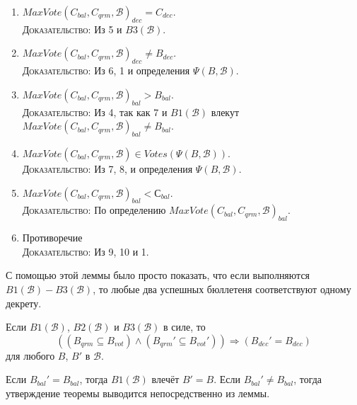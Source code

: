 \documentclass[12pt, a4paper]{article} %
\begin{document}
\begin{lemmaproof}
\begin{enumerate}
    \item $MaxVote(C_{bal}, C_{qrm}, \mathcal{B})_{dec} = C_{dec}$.\\
          \textsc{Доказательство}: Из 5 и $B3(\mathcal{B})$.

    \item $MaxVote(C_{bal}, C_{qrm}, \mathcal{B})_{dec} \neq B_{dec}$.\\
          \textsc{Доказательство}: Из 6, 1 и определения $\Psi(B, \mathcal{B})$.

    \item $MaxVote(C_{bal}, C_{qrm}, \mathcal{B})_{bal} > B_{bal}$.\\
          \textsc{Доказательство}: Из 4, так как 7 и $B1(\mathcal{B})$ влекут \\
          $MaxVote(C_{bal}, C_{qrm}, \mathcal{B})_{bal} \neq B_{bal}$.

    \item $MaxVote(C_{bal}, C_{qrm}, \mathcal{B}) \in Votes(\Psi(B, \mathcal{B}))$.\\
          \textsc{Доказательство}: Из 7, 8, и определения $\Psi(B, \mathcal{B})$.

    \item $MaxVote(C_{bal}, C_{qrm}, \mathcal{B})_{bal} < С_{bal}$.\\
          \textsc{Доказательство}: По определению $MaxVote(C_{bal}, C_{qrm}, \mathcal{B})_{bal}$.
    
    \item Противоречие\\
          \textsc{Доказательство}: Из 9, 10 и 1.
\end{enumerate}
\end{lemmaproof}

С помощью этой леммы было просто показать, что если выполняются $B1(\mathcal{B}) - B3(\mathcal{B})$, то любые два успешных бюллетеня соответствуют одному декрету.
\begin{theorem}
Если $B1(\mathcal{B})$, $B2(\mathcal{B})$ и $B3(\mathcal{B})$ в силе, то
\[
    ((B_{qrm} \subseteq B_{vot}) \land (B_{qrm}' \subseteq B_{vot}')) \Rightarrow (B_{dec}' = B_{dec})
\]
для любого $B$, $B'$ в $\mathcal{B}$.
\end{theorem}
\begin{theoremproof}
Если $B_{bal}' = B_{bal}$, тогда $B1(\mathcal{B})$ влечёт $B' = B$. Если $B_{bal}' \neq B_{bal}$, тогда утверждение теоремы выводится непосредственно из леммы.
\end{theoremproof}
\end{document}
